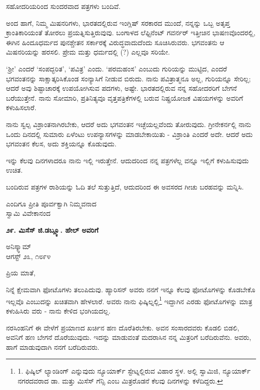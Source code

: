 ಸಹೋದರಿಯರಿಂದ ಸುಂದರವಾದ ಪತ್ರಗಳು ಬಂದಿವೆ.

ಅಂದ ಹಾಗೆ, ನಿಮ್ಮ ಮಿಷನರಿಗಳು, ಭಾರತದಲ್ಲಿರುವ ಇಂಗ್ಲಿಷ್ ಸರಕಾರದ ಮುಂದೆ, ನನ್ನನ್ನು ಒಬ್ಬ ಅತೃಪ್ತ ಕ್ರಾಂತಿಕಾರಿಯಂತೆ ತೋರಲು ಪ್ರಯತ್ನಿಸುತ್ತಿರುವುವು. ಬಂಗಾಳದ ಲೆಫ್ಟಿನೆಂಟ್ ಗವರ್ನರ್ ಇತ್ತೀಚಿನ ಭಾಷಣವೊಂದರಲ್ಲಿ, ಈಗಿನ ಹಿಂದೂಧರ್ಮದ ಪುನಶ್ಚೇತನ ಸರ್ಕಾರಕ್ಕೆ ವಿರುದ್ಧವಾದುದೆಂದು ಸೂಚಿಸಿರುವರು. ಭಗವಂತನು ಆ ಮಿಷನರಿಯನ್ನು ಹರಸಲಿ. ಪ್ರೇಮ ಮತ್ತು ಧರ್ಮದಲ್ಲಿ (?) ಎಲ್ಲವೂ ಸರಿಯೇ.

‘ಶ‍್ರೀ’ ಎಂದರೆ ‘ಸಂಪದ್ಭರಿತ’, ‘ಪವಿತ್ರ’ ಎಂದು. ‘ಪರಮಹಂಸ’ ಎಂಬುದು ಗುರಿಯನ್ನು ಮುಟ್ಟಿದ, ಎಂದರೆ ಭಗವಂತನನ್ನು ಸಾಕ್ಷಾತ್ಕರಿಸಿಕೊಂಡ ಸಂನ್ಯಾಸಿಗೆ ನೀಡುವ ಬಿರುದು. ನಾನು ಪವಿತ್ರಾತ್ಮನೂ ಅಲ್ಲ, ಗುರಿಯನ್ನೂ ಸೇರಿಲ್ಲ; ಆದರೆ ಅವು ಶಿಷ್ಟಾಚಾರಕ್ಕೆ ಉಪಯೋಗಿಸುವ ಪದಗಳು, ಅಷ್ಟೇ. ಭಾರತದಲ್ಲಿರುವ ನನ್ನ ಸಹೋದರರಿಗೆ ಬೇಗನೆ ಬರೆಯುತ್ತೇನೆ. ನಾನು ಸೋಮಾರಿ, ಪ್ರತಿನಿತ್ಯವೂ ವೃತ್ತಪತ್ರಿಕೆಗಳಲ್ಲಿ ಬರುವ ನಿಷ್ಪ್ರಯೋಜಕ ವಿಷಯಗಳನ್ನು ಅವರಿಗೆ ಕಳುಹಿಸಲಾರೆ.

ನಾನು ಸ್ವಲ್ಪ ವಿಶ್ರಾಂತನಾಗಿರಬೇಕು, ಆದರೆ ಅದು ಭಗವಂತನ ಇಚ್ಛೆಯಲ್ಲವೆಂದು ತೋರುವುದು. ಗ್ರೀನೇಕರ್ನಲ್ಲಿ ನಾನು ಒಂದು ದಿನದಲ್ಲಿ ಸುಮಾರು ಏಳೆಂಟು ಉಪನ್ಯಾಸಗಳನ್ನು ಮಾಡಬೇಕಾಯಿತು - ವಿಶ್ರಾಂತಿ ಎಂದರೆ ಅದೇ. ಆದರೆ ಅದು ಭಗವಂತನ ಕೆಲಸ, ಅದು ಶಕ್ತಿಯನ್ನೂ ಕೊಡುವುದು.

ಇನ್ನು ಕೆಲವು ದಿನಗಳಾದರೂ ನಾನು ಇಲ್ಲಿ ಇರುತ್ತೇನೆ. ಆದುದರಿಂದ ನನ್ನ ಪತ್ರಗಳೆಲ್ಲ ವನ್ನೂ ಇಲ್ಲಿಗೆ ಕಳುಹಿಸುವುದು ಉಚಿತ.

ಬಂದಿರುವ ಪತ್ರಗಳ ರಾಶಿಯನ್ನು ಓದಿ ತಲೆ ಸುತ್ತುತ್ತಿದೆ, ಆದುದರಿಂದ ಈ ಅವಸರದ ಗೀಚು ಬರಹವನ್ನು ಮನ್ನಿಸಿ.

\begin{flushright}
ಎಂದಿಗೂ ಪ್ರೀತಿ ಪೂರ್ವಕ್ವಾಗಿ ನಿಮ್ಮವನಾದ\\ಸ್ವಾಮಿ ವಿವೇಕಾನಂದ
\end{flushright}

\begin{center}
\textbf{೨೯. ಮಿಸೆಸ್ ಜಿ.ಡಬ್ಲ್ಯೂ. ಹೇಲ್ ಅವರಿಗೆ}
\end{center}

\begin{flushright}
ಅನಿಸ್ಕ್ವಾಮ್​\\ಆಗಸ್ಟ್ ೨೩, ೧೮೯೪
\end{flushright}

ಪ್ರಿಯ ಮಾತೆ,

ನಿನ್ನೆ ಕ್ಷೇಮವಾಗಿ ಫೋಟೊಗಳು ತಲುಪಿದುವು. ಹ್ಯಾರಿಸನ್ ಅವರು ನನಗೆ ಇನ್ನೂ ಕೆಲವು ಫೋಟೊಗಳನ್ನು ಕೊಡಬೇಕೊ ಇಲ್ಲವೊ ಎಂಬುದನ್ನು ಖಚಿತವಾಗಿ ಹೇಳಲಾರೆ. ಅವರು ನಾನು ಫಿಷ್ಕಿಲ್ನಲ್ಲಿ\footnote{1. ಫಿಷ್ಕಿಲ್ ಲ್ಯಾಂಡಿಂಗ್ ಎನ್ನುವುದು ನ್ಯೂಯಾರ್ಕ್ ಸ್ಟೇಟ್ನಲ್ಲಿರುವ ವಿಹಾರ ಸ್ಥಳ. ಅಲ್ಲಿ ಸ್ವಾಮಿಜಿ, ನ್ಯೂಯಾರ್ಕ್ ನಗರದವರಾದ ಡಾ. ಮತ್ತು ಮಿಸೆಸ್ ಗೆನ್ಸಿ ಎಂಬ ಮಿತ್ರರೊಡನೆ ಕೆಲವು ದಿನಗಳನ್ನು ಕಳೆದಿದ್ದರು.} ಇದ್ದಾಗಿನ ಎರಡು ಫೋಟೊಗಳನ್ನು ಮಾತ್ರ ಕಳುಹಿಸಿರು ವರು - ನಾನು ಕೇಳಿದ ಭಂಗಿಯದಲ್ಲ.

ನರಸಿಂಹನಿಗೆ ಈ ವೇಳೆಗೆ ಪ್ರಯಾಣದ ಖರ್ಚಿನ ಹಣ ದೊರೆತಿರಬೇಕು. ಅವನ ಸಂಸಾರದವರು ಕೊಡಲಿ ಬಿಡಲಿ, ಅವನಿಗೆ ಹಣ ಬೇಗನೆ ದೊರೆಯುವುದು. ಇದನ್ನು ಮಾಡುವಂತೆ ಮದರಾಸಿನ ನನ್ನ ಮಿತ್ರರಿಗೆ ಬರೆದಿರುವೆನು. ಅವರು, ಹಾಗೆ ಮಾಡುವುದಾಗಿ ನನಗೆ ಬರೆದಿರುವರು.

